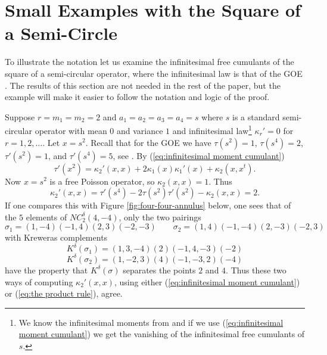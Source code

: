 \documentclass[11pt]{amsart}
\theoremstyle{definition}
\numberwithin{theorem}{section}
\newcommand{\NC}{\mathit{NC}}
\begin{document}
\section{Small Examples with the Square of a Semi-Circle}\label{section:small example}



To illustrate the notation let us examine the infinitesimal
free cumulants of the square of a semi-circular operator,
where the infinitesimal law is that of the GOE \cite{m}. The
results of this section are not needed in the rest of the
paper, but the example will make it easier to follow the
notation and logic of the proof.

Suppose $r = m_1 = m_2 = 2$ and $a_1 = a_2 = a_3 = a_4 = s$
where $s$ is a standard semi-circular operator with mean $0$
and variance $1$ and infinitesimal law\footnote{We know the
infinitesimal moments from \cite{m} and if we use
(\ref{eq:infinitesimal moment cumulant}) we get the
vanishing of the infinitesimal free cumulants of $s$.}
$\kappa_r' = 0$ for $r = 1, 2, \dots$. Let $x = s^2$. Recall
that for the GOE we have $\tau(s^2) = 1$, $\tau(s^4) = 2$,
$\tau'(s^2) = 1$, and $\tau'(s^4) = 5$, see \cite[Lemma
  23]{m}. By (\ref{eq:infinitesimal moment cumulant})
\[
\tau'(x^2) = \kappa_2'(x, x) + 2 \kappa_1(x) \kappa_1'(x) + \kappa_2(x, x^t).
\]
Now $x = s^2$ is a free Poisson operator, so $\kappa_2(x, x) = 1$. Thus
\[
\kappa_2'(x, x) = \tau'(s^4) - 2 \tau(s^2) \tau'(s^2) - \kappa_2(x, x)
= 2.
\]
If one compares this with Figure \ref{fig:four-four-annulus}
below, one sees that of the $5$ elements of $\NC_2^\delta(4,
-4)$, only the two pairings
\[
\sigma_1 = (1, -4)(-1, 4)(2, 3)(-2, -3) \qquad
\sigma_2 = (1, 4)(-1, -4)(2, -3)(-2, 3)
\]
with Kreweras complements
\[
K^\delta(\sigma_1) = (1, 3, -4)(2)(-1, 4, -3)(-2)
\]
\[
K^\delta(\sigma_2) = (1, -2, 3)(4)(-1, -3, 2)(-4)
\]
have the property that $K^\delta(\sigma)$ separates the
points $2$ and $4$. Thus these two ways of computing
$\kappa_2'(x, x)$, using either (\ref{eq:infinitesimal
  moment cumulant}) or (\ref{eq:the product rule}), agree.
\end{document}
